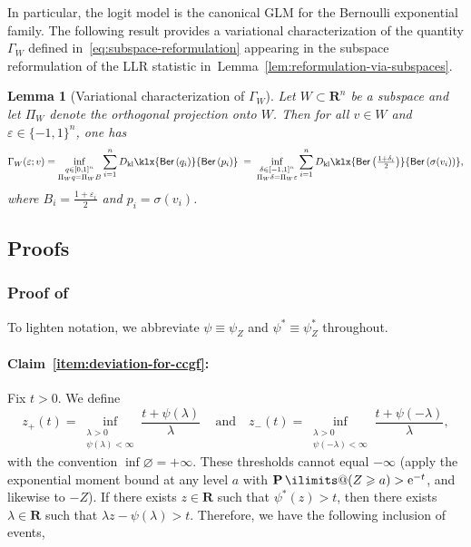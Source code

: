 \documentclass[11pt, letterpaper, hidelinks]{article}
\makeatletter
\newcommand{\R}{\mathbf R}
\newcommand{\e}{\mathrm{e}}
\newcommand{\1}{\mathbf 1}
\newcommand{\eps}{\varepsilon}
\renewcommand{\geq}{\geqslant}
\newcommand{\kl}{D_{\rm kl}\klx}
\renewcommand{\P}{\operatorname*{\mathbf{P}}\ilimits@}
\theoremstyle{plain}
\newtheorem{lemma}{Lemma}[section]
\theoremstyle{definition}
\newcommand{\defn}{=}
\newcommand{\Ber}[1]{\mathsf{Ber}\left(#1\right)}
\makeatother
\begin{document}
In particular, the logit model is the canonical GLM for the Bernoulli exponential family. The following result provides a variational characterization of the quantity $\Gamma_W$ defined in~\eqref{eq:subspace-reformulation} appearing in the subspace reformulation of the LLR statistic in~Lemma~\ref{lem:reformulation-via-subspaces}.


\begin{lemma}[Variational characterization of $\Gamma_W$]
\label{lem:var-char}
Let $W \subset \R^n$ be a subspace and let $\Pi_W$ denote the orthogonal projection onto $W$. Then for all $v \in W$ and $\eps \in \{-1,1\}^n$, one has
\[
  \Gamma_W(\eps;v)
  =
  \inf_{\substack{q\in[0,1]^n\\ \Pi_W q = \Pi_W B}}
  \sum_{i=1}^n \kl{\Ber{q_i}}{\Ber{p_i}}
  \;=\;
  \inf_{\substack{\delta\in[-1,1]^n\\ \Pi_W\delta = \Pi_W\eps}}
  \sum_{i=1}^n
  \kl{\Ber{\tfrac{1+\delta_i}{2}}}{\Ber{\sigma(v_i)}},
\]
where $B_i \defn \tfrac{1+\eps_i}{2}$ and $p_i \defn \sigma(v_i)$.
\end{lemma}



\subsection{Proofs}
\label{sec:proofs-cgf-univariate}
\subsubsection{Proof of~}
\label{sec:proof-univariate-CGF}
To lighten notation, we abbreviate $\psi \equiv \psi_Z$ and $\psi^\ast \equiv \psi_Z^\ast$ throughout.

\paragraph{Claim~\ref{item:deviation-for-ccgf}:}
Fix $t>0$. We define
\begin{equation}
	z_+(t) = \inf_{\substack{\lambda>0\\ \psi(\lambda)<\infty}} \frac{t+\psi(\lambda)}{\lambda}\,  \quad \mbox{and} \quad 
	z_-(t) = \inf_{\substack{\lambda>0\\ \psi(-\lambda)<\infty}} \frac{t+\psi(-\lambda)}{\lambda},
\end{equation}
with the convention $\inf\varnothing=+\infty$. These thresholds cannot equal $-\infty$ (apply the exponential moment bound at any level $a$ with $\P(Z\geq a)>\e^{-t}$, and likewise to $-Z$).
If there exists $z\in \R$ such that $\psi^*(z) >t$, then there exists $\lambda \in \R$ such that $\lambda z - \psi(\lambda) >t$. Therefore, we have the following inclusion of events,
\end{document}

